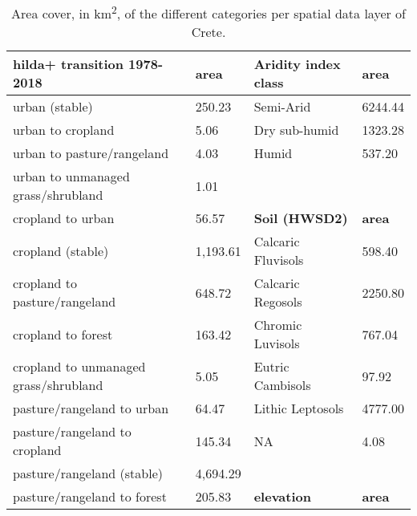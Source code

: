 \begin{longtable}{llll}
    \caption{Area cover, in km\textsuperscript{2}, of the different categories per spatial data layer of Crete. \label{table:crete_data_cube_area}} \\
\textbf{hilda+ transition 1978-2018}               & \textbf{area} & \textbf{Aridity index class}               & \textbf{area}    \\
\endfirsthead
%
\endhead
%
urban (stable)                                     & 250.23        & Semi-Arid                                  & 6244.44          \\
urban to cropland                                  & 5.06          & Dry sub-humid                              & 1323.28          \\
urban to pasture/rangeland                         & 4.03          & Humid                                      & 537.20           \\
urban to unmanaged grass/shrubland                 & 1.01          &                                            &                  \\
cropland to urban                                  & 56.57         & \textbf{Soil (HWSD2)}                      & \textbf{area}    \\
cropland (stable)                                  & 1,193.61      & Calcaric Fluvisols                         & 598.40           \\
cropland to pasture/rangeland                      & 648.72        & Calcaric Regosols                          & 2250.80          \\
cropland to forest                                 & 163.42        & Chromic Luvisols                           & 767.04           \\
cropland to unmanaged grass/shrubland              & 5.05          & Eutric Cambisols                           & 97.92            \\
pasture/rangeland to urban                         & 64.47         & Lithic Leptosols                           & 4777.00          \\
pasture/rangeland to cropland                      & 145.34        & NA                                         & 4.08             \\
pasture/rangeland (stable)                         & 4,694.29      &                                            &                  \\
pasture/rangeland to forest                        & 205.83        & \textbf{elevation}                         & \textbf{area}    \\

\end{longtable}

